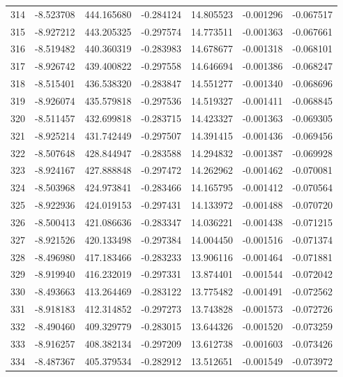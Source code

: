 \begin{tabular}{rrrrrrr}
 314 &  -8.523708 &  444.165680 & -0.284124 &   14.805523 &   -0.001296 & -0.067517 \\
 315 &  -8.927212 &  443.205325 & -0.297574 &   14.773511 &   -0.001363 & -0.067661 \\
 316 &  -8.519482 &  440.360319 & -0.283983 &   14.678677 &   -0.001318 & -0.068101 \\
 317 &  -8.926742 &  439.400822 & -0.297558 &   14.646694 &   -0.001386 & -0.068247 \\
 318 &  -8.515401 &  436.538320 & -0.283847 &   14.551277 &   -0.001340 & -0.068696 \\
 319 &  -8.926074 &  435.579818 & -0.297536 &   14.519327 &   -0.001411 & -0.068845 \\
 320 &  -8.511457 &  432.699818 & -0.283715 &   14.423327 &   -0.001363 & -0.069305 \\
 321 &  -8.925214 &  431.742449 & -0.297507 &   14.391415 &   -0.001436 & -0.069456 \\
 322 &  -8.507648 &  428.844947 & -0.283588 &   14.294832 &   -0.001387 & -0.069928 \\
 323 &  -8.924167 &  427.888848 & -0.297472 &   14.262962 &   -0.001462 & -0.070081 \\
 324 &  -8.503968 &  424.973841 & -0.283466 &   14.165795 &   -0.001412 & -0.070564 \\
 325 &  -8.922936 &  424.019153 & -0.297431 &   14.133972 &   -0.001488 & -0.070720 \\
 326 &  -8.500413 &  421.086636 & -0.283347 &   14.036221 &   -0.001438 & -0.071215 \\
 327 &  -8.921526 &  420.133498 & -0.297384 &   14.004450 &   -0.001516 & -0.071374 \\
 328 &  -8.496980 &  417.183466 & -0.283233 &   13.906116 &   -0.001464 & -0.071881 \\
 329 &  -8.919940 &  416.232019 & -0.297331 &   13.874401 &   -0.001544 & -0.072042 \\
 330 &  -8.493663 &  413.264469 & -0.283122 &   13.775482 &   -0.001491 & -0.072562 \\
 331 &  -8.918183 &  412.314852 & -0.297273 &   13.743828 &   -0.001573 & -0.072726 \\
 332 &  -8.490460 &  409.329779 & -0.283015 &   13.644326 &   -0.001520 & -0.073259 \\
 333 &  -8.916257 &  408.382134 & -0.297209 &   13.612738 &   -0.001603 & -0.073426 \\
 334 &  -8.487367 &  405.379534 & -0.282912 &   13.512651 &   -0.001549 & -0.073972 \\

\end{tabular}
